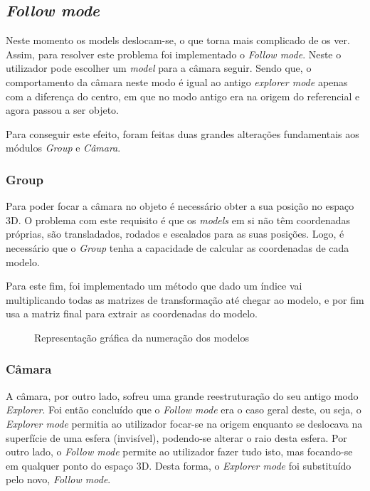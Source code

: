 \documentclass[a4paper]{article}
\begin{document}
\subsection{\textit{Follow mode}}

Neste momento os models deslocam-se, o que torna mais complicado de os ver. Assim, para resolver este problema
foi implementado o \textit{Follow mode}. Neste o utilizador pode escolher um \textit{model}
para a câmara seguir. Sendo que, o comportamento da câmara neste modo é igual ao antigo
\textit{explorer mode} apenas com a diferença do centro, em que no modo antigo era na origem do referencial e agora passou a ser objeto.

Para conseguir este efeito, foram feitas duas grandes alterações fundamentais aos módulos \textit{Group} e \textit{Câmara}.

\subsubsection{Group}

Para poder focar a câmara no objeto é necessário obter a sua posição no espaço 3D. O problema com este requisito é que os \textit{models} em si não têm coordenadas próprias, são transladados, rodados e escalados para as suas posições. Logo, é necessário que o \textit{Group} tenha a capacidade de calcular as coordenadas de cada modelo.

Para este fim, foi implementado um método que dado um índice vai multiplicando todas as matrizes de transformação até chegar ao modelo, e por fim usa a matriz final para extrair as coordenadas do modelo.

\begin{figure}[H]
    \centering
    
    \caption{Representação gráfica da numeração dos modelos}
\end{figure}

\subsubsection{Câmara}

A câmara, por outro lado, sofreu uma grande reestruturação do seu antigo modo \textit{Explorer}.
Foi então concluído que o \textit{Follow mode} era o caso geral deste, ou seja, o \textit{Explorer mode}
permitia ao utilizador focar-se na origem enquanto se deslocava na superfície de uma esfera (invisível), podendo-se alterar o raio desta esfera. Por outro lado, o \textit{Follow mode} permite
ao utilizador fazer tudo isto, mas focando-se em qualquer ponto do espaço 3D. Desta forma, o \textit{Explorer mode} foi substituído pelo novo, \textit{Follow mode}.
\end{document}

